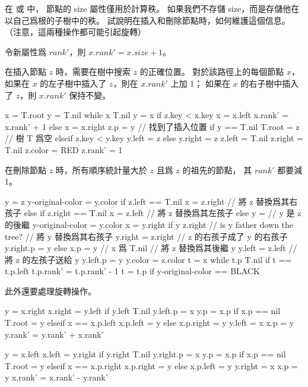 \startEXERCISE
在  或  中，
節點的 size 屬性僅用於計算秩。
如果我們不存儲 size，而是存儲他在以自己爲根的子樹中的秩。
試說明在插入和刪除節點時，如何維護這個信息。
（注意，這兩種操作都可能引起旋轉）
\stopEXERCISE

\startANSWER
令新屬性爲 $rank'$，則 $x.rank' = x.size + 1$。

在插入節點 $z$ 時，需要在樹中搜索 $z$ 的正確位置。
對於該路徑上的每個節點 $x$，
如果在 $x$ 的左子樹中插入了 $z$，則在 $x.rank'$ 上加 1；
如果在 $x$ 的右子樹中插入了 $z$，則 $x.rank'$ 保持不變。

\startCLRSCODE
x = T.root
y = T.nil
while x \ne T.nil
	y = x
	if z.key < x.key
		x = x.left
		x.rank' = x.rank' + 1
	else
		x = x.right
z.p = y	// 找到了插入位置
if y == T.nil
	T.root = z	// 樹 T 爲空
elseif z.key < y.key
	y.left = z
else
	y.right = z
z.left = T.nil
z.right = T.nil
z.color = RED
z.rank' = 1
\stopCLRSCODE

在刪除節點 $z$ 時，所有順序統計量大於 $z$ 且爲 $z$ 的祖先的節點，
其 $rank'$ 都要減 1。

\startCLRSCODE
y = z
y-original-color = y.color
if z.left == T.nil
	x = z.right
	    // 將 z 替換爲其右孩子
else if z.right == T.nil
	x = z.left
		// 將 z 替換爲其左孩子
else
	y = 	// y 是 z 的後繼
	y-original-color = y.color
	x = y.right
	if y \ne z.right	// is y father down the tree?
			// 將 y 替換爲其右孩子
		y.right = z.right	// z 的右孩子成了 y 的右孩子
		y.right.p = y     
	else
		x.p = y	// x 爲 T.nil
		// 將 z 替換爲其後繼 y
	y.left = z.left			// 將 z 的左孩子送給 y
	y.left.p = y
	y.color = z.color
t = x
while t.p \ne T.nil
	if t == t.p.left
		t.p.rank' = t.p.rank' - 1
	t = t.p
if y-original-color == BLACK
\stopCLRSCODE

此外還要處理旋轉操作。

\startCLRSCODE
y = x.right
x.right = y.left
if y.left \ne T.nil
	y.left.p = x
y.p = x.p
if x.p == nil
	T.root = y
elseif x == x.p.left
	x.p.left = y
else
	x.p.right = y
y.left = x
x.p = y
y.rank' = y.rank' + x.rank'
\stopCLRSCODE

\startCLRSCODE
y = x.left
x.left = y.right
if y.right \ne T.nil
	y.right.p = x
y.p = x.p
if x.p == nil
	T.root = y
elseif x == x.p.right
	x.p.right = y
else
	x.p.left = y
y.right = x
x.p = y
x.rank' = x.rank' - y.rank'
\stopCLRSCODE
\stopANSWER
